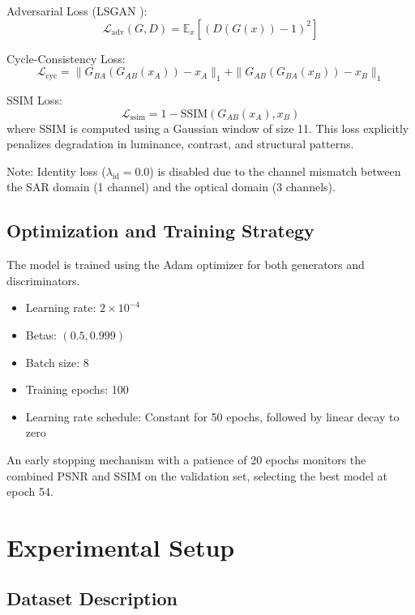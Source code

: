 \documentclass[conference]{IEEEtran}
\begin{document}
Adversarial Loss (LSGAN \cite{mao2017least}):
\begin{equation}
\mathcal{L}_{\text{adv}}(G, D) = \mathbb{E}_{x}\left[(D(G(x)) - 1)^2\right]
\end{equation}

Cycle-Consistency Loss:
\begin{equation}
\mathcal{L}_{\text{cyc}} = \|G_{BA}(G_{AB}(x_A)) - x_A\|_1 + \|G_{AB}(G_{BA}(x_B)) - x_B\|_1
\end{equation}

SSIM Loss:
\begin{equation}
\mathcal{L}_{\text{ssim}} = 1 - \text{SSIM}(G_{AB}(x_A), x_B)
\end{equation}
where SSIM is computed using a Gaussian window of size 11. This loss explicitly penalizes degradation in luminance, contrast, and structural patterns.

Note: Identity loss ($\lambda_{\text{id}} = 0.0$) is disabled due to the channel mismatch between the SAR domain (1 channel) and the optical domain (3 channels).

\subsection{Optimization and Training Strategy}

The model is trained using the Adam optimizer \cite{kingma2015adam} for both generators and discriminators.
\begin{itemize}
    \item Learning rate: $2 \times 10^{-4}$
    \item Betas: $(0.5, 0.999)$
    \item Batch size: 8
    \item Training epochs: 100
    \item Learning rate schedule: Constant for 50 epochs, followed by linear decay to zero
\end{itemize}

An early stopping mechanism with a patience of 20 epochs monitors the combined PSNR and SSIM on the validation set, selecting the best model at epoch 54.

\section{Experimental Setup}

\subsection{Dataset Description}
\end{document}
